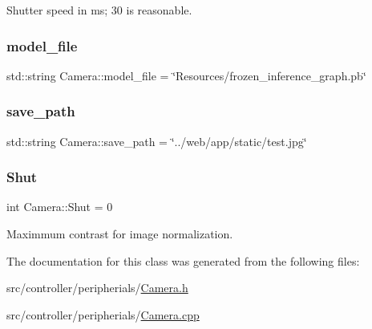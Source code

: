 Shutter speed in ms; 30 is reasonable. 

\mbox{\label{classCamera_a22a0754fc359b253e203ce59026021a0}} 
\subsubsection{\texorpdfstring{model\+\_\+file}{model\_file}}
{\footnotesize\ttfamily std\+::string Camera\+::model\+\_\+file = \char`\"{}Resources/frozen\+\_\+inference\+\_\+graph.\+pb\char`\"{}\hspace{0.3cm}{\ttfamily [private]}}

\mbox{\label{classCamera_a1ed93fa883066dfbc6fa88b267aefabe}} 
\subsubsection{\texorpdfstring{save\+\_\+path}{save\_path}}
{\footnotesize\ttfamily std\+::string Camera\+::save\+\_\+path = \char`\"{}../web/app/static/test.\+jpg\char`\"{}\hspace{0.3cm}{\ttfamily [private]}}

\mbox{\label{classCamera_ad3d6176cdcccecd116f2e7867b642ad1}} 
\subsubsection{\texorpdfstring{Shut}{Shut}}
{\footnotesize\ttfamily int Camera\+::\+Shut = 0\hspace{0.3cm}{\ttfamily [private]}}



Maximmum contrast for image normalization. 



The documentation for this class was generated from the following files\+:\begin{DoxyCompactItemize}
\item 
src/controller/peripherials/\hyperlink{Camera_8h}{Camera.\+h}\item 
src/controller/peripherials/\hyperlink{Camera_8cpp}{Camera.\+cpp}\end{DoxyCompactItemize}
